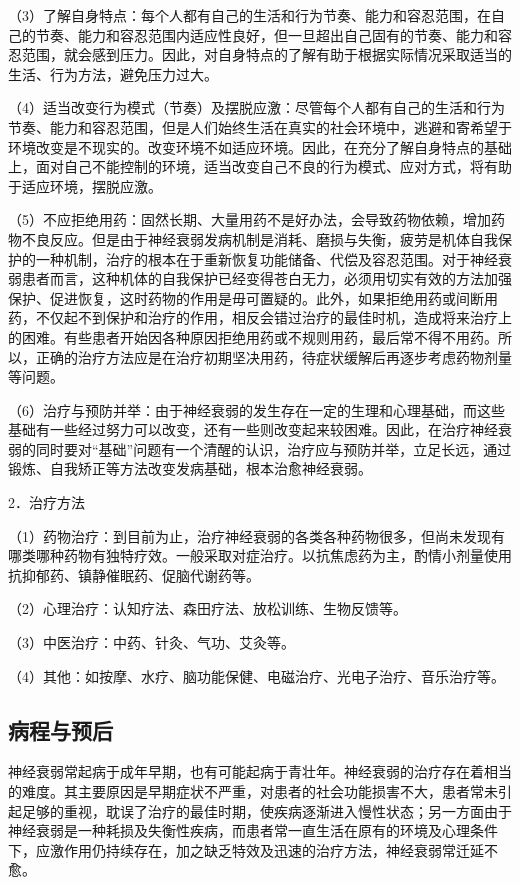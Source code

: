 （3）了解自身特点：每个人都有自己的生活和行为节奏、能力和容忍范围，在自己的节奏、能力和容忍范围内适应性良好，但一旦超出自己固有的节奏、能力和容忍范围，就会感到压力。因此，对自身特点的了解有助于根据实际情况采取适当的生活、行为方法，避免压力过大。

（4）适当改变行为模式（节奏）及摆脱应激：尽管每个人都有自己的生活和行为节奏、能力和容忍范围，但是人们始终生活在真实的社会环境中，逃避和寄希望于环境改变是不现实的。改变环境不如适应环境。因此，在充分了解自身特点的基础上，面对自己不能控制的环境，适当改变自己不良的行为模式、应对方式，将有助于适应环境，摆脱应激。

（5）不应拒绝用药：固然长期、大量用药不是好办法，会导致药物依赖，增加药物不良反应。但是由于神经衰弱发病机制是消耗、磨损与失衡，疲劳是机体自我保护的一种机制，治疗的根本在于重新恢复功能储备、代偿及容忍范围。对于神经衰弱患者而言，这种机体的自我保护已经变得苍白无力，必须用切实有效的方法加强保护、促进恢复，这时药物的作用是毋可置疑的。此外，如果拒绝用药或间断用药，不仅起不到保护和治疗的作用，相反会错过治疗的最佳时机，造成将来治疗上的困难。有些患者开始因各种原因拒绝用药或不规则用药，最后常不得不用药。所以，正确的治疗方法应是在治疗初期坚决用药，待症状缓解后再逐步考虑药物剂量等问题。

（6）治疗与预防并举：由于神经衰弱的发生存在一定的生理和心理基础，而这些基础有一些经过努力可以改变，还有一些则改变起来较困难。因此，在治疗神经衰弱的同时要对“基础”问题有一个清醒的认识，治疗应与预防并举，立足长远，通过锻炼、自我矫正等方法改变发病基础，根本治愈神经衰弱。

2．治疗方法

（1）药物治疗：到目前为止，治疗神经衰弱的各类各种药物很多，但尚未发现有哪类哪种药物有独特疗效。一般采取对症治疗。以抗焦虑药为主，酌情小剂量使用抗抑郁药、镇静催眠药、促脑代谢药等。

（2）心理治疗：认知疗法、森田疗法、放松训练、生物反馈等。

（3）中医治疗：中药、针灸、气功、艾灸等。

（4）其他：如按摩、水疗、脑功能保健、电磁治疗、光电子治疗、音乐治疗等。

\subsection{病程与预后}

神经衰弱常起病于成年早期，也有可能起病于青壮年。神经衰弱的治疗存在着相当的难度。其主要原因是早期症状不严重，对患者的社会功能损害不大，患者常未引起足够的重视，耽误了治疗的最佳时期，使疾病逐渐进入慢性状态；另一方面由于神经衰弱是一种耗损及失衡性疾病，而患者常一直生活在原有的环境及心理条件下，应激作用仍持续存在，加之缺乏特效及迅速的治疗方法，神经衰弱常迁延不愈。

